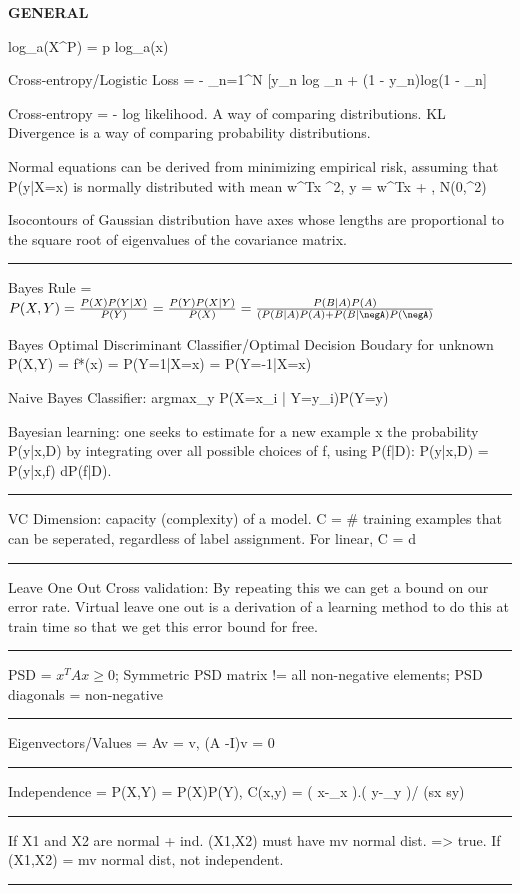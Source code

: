 \documentclass[a4paper,twoside,twocolumn]{article}
\date{}
\title{}
\begin{document}
\newpage
\newpage
\newpage

\textbf{GENERAL}

\setlength{\parindent}{0pt}
{\scriptsize
log_a(X^P) = p log_a(x)

Cross-entropy/Logistic Loss = -  \Sum_{n=1}^N [y_n log _n + (1 - y_n)log(1 - _n]

Cross-entropy = - log likelihood. A way of comparing distributions. KL Divergence is a way of comparing probability distributions.

Normal equations can be derived from minimizing empirical risk, assuming that P(y|X=x) is normally distributed with mean w^Tx  \sigma^2, y = w^Tx + \epsilon,  \epsilon \approx N(0,\sigma^2)

Isocontours of Gaussian distribution have axes whose lengths are proportional to the square root of eigenvalues of the covariance matrix.

\noindent\rule{8cm}{0.4pt}

Bayes Rule = $P(X,Y) = \tfrac{P(X)P(Y|X)}{P(Y)} = \tfrac{P(Y)P(X|Y)}{P(X)} = \tfrac{P(B|A)P(A)}{(P(B|A)P(A) + P(B|\negA)P(\negA)}$

Bayes Optimal Discriminant Classifier/Optimal Decision Boudary for unknown P(X,Y) = f*(x) = P(Y=1|X=x) = P(Y=-1|X=x)

Naive Bayes Classifier: argmax_y \prod P(X=x_i | Y=y_i)P(Y=y)

Bayesian learning: one seeks to estimate for a new example x the probability P(y|x,D) by integrating over all possible choices of f, using P(f|D): P(y|x,D) = \int P(y|x,f) dP(f|D).

\noindent\rule{8cm}{0.4pt}

VC Dimension: capacity (complexity) of a model. C = # training examples that can be seperated, regardless of label assignment. For linear, C = d

\noindent\rule{8cm}{0.4pt}

Leave One Out Cross validation: By repeating this we can get a bound on our error rate. Virtual leave one out is a derivation of a learning method to do this at train time so that we get this error bound for free.

\noindent\rule{8cm}{0.4pt}

PSD = $x^TAx \geq 0$; Symmetric PSD matrix != all non-negative elements; PSD diagonals = non-negative

\noindent\rule{8cm}{0.4pt}

Eigenvectors/Values = Av = \lambda v, (A -\lambda I)v = 0



\noindent\rule{8cm}{0.4pt}

Independence = P(X,Y) = P(X)P(Y), C(x,y) = ( x-\mu_x ).( y-\mu_y )/ (sx sy)

\noindent\rule{8cm}{0.4pt}

If X1 and X2 are normal + ind. (X1,X2) must have mv normal dist. => true. If (X1,X2) = mv normal dist, not independent.

\noindent\rule{8cm}{0.4pt}

}
\end{document}
